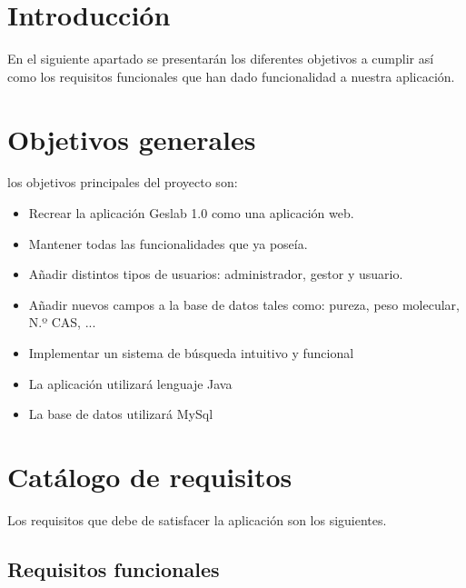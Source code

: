 
\section{Introducción}

En el siguiente apartado se presentarán los diferentes objetivos a cumplir así como los requisitos funcionales que han dado funcionalidad a nuestra aplicación.

\section{Objetivos generales}

los objetivos principales del proyecto son:

\begin{itemize}
	\item Recrear la aplicación Geslab 1.0 como una aplicación web.
	\item Mantener todas las funcionalidades que ya poseía.
	\item Añadir distintos tipos de usuarios: administrador, gestor y usuario.
	\item Añadir nuevos campos a la base de datos tales como: pureza, peso molecular, N.º CAS, ...
	\item Implementar un sistema de búsqueda intuitivo y funcional
	\item La aplicación utilizará lenguaje Java
	\item La base de datos utilizará MySql
\end{itemize}

\section{Catálogo de requisitos}

Los requisitos que debe de satisfacer la aplicación son los siguientes.

\subsection{Requisitos funcionales}

